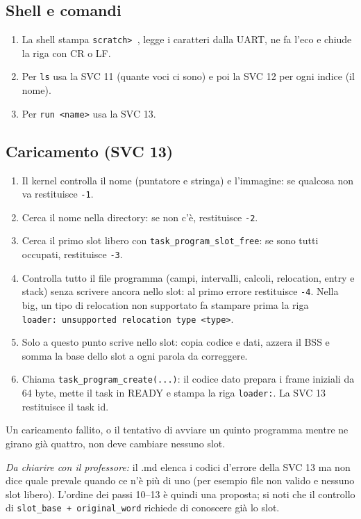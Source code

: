\subsection{Shell e comandi}
\begin{enumerate}\sloppy\setcounter{enumi}{6}
\item La shell stampa \texttt{scratch> }, legge i caratteri dalla UART, ne fa l'eco e chiude la riga con CR o LF.
\item Per \texttt{ls} usa la SVC 11 (quante voci ci sono) e poi la SVC 12 per ogni indice (il nome).
\item Per \texttt{run <name>} usa la SVC 13.
\end{enumerate}

\subsection{Caricamento (SVC 13)}
\begin{enumerate}\sloppy\setcounter{enumi}{9}
\item Il kernel controlla il nome (puntatore e stringa) e l'immagine: se qualcosa non va restituisce \texttt{-1}.
\item Cerca il nome nella directory: se non c'è, restituisce \texttt{-2}.
\item Cerca il primo slot libero con \texttt{task\_program\_slot\_free}: se sono tutti occupati, restituisce \texttt{-3}.
\item Controlla tutto il file programma (campi, intervalli, calcoli, relocation, entry e stack) senza scrivere ancora nello slot: al primo errore restituisce \texttt{-4}. Nella big, un tipo di relocation non supportato fa stampare prima la riga \texttt{loader:\ unsupported relocation type <type>}.
\item Solo a questo punto scrive nello slot: copia codice e dati, azzera il BSS e somma la base dello slot a ogni parola da correggere.
\item Chiama \texttt{task\_program\_create(...)}: il codice dato prepara i frame iniziali da 64 byte, mette il task in READY e stampa la riga \texttt{loader:}. La SVC 13 restituisce il task id.
\end{enumerate}

Un caricamento fallito, o il tentativo di avviare un quinto programma mentre ne girano già quattro, non deve cambiare nessuno slot.

\emph{Da chiarire con il professore:} il .md elenca i codici d'errore della SVC 13 ma non dice quale prevale quando ce n'è più di uno (per esempio file non valido e nessuno slot libero). L'ordine dei passi 10--13 è quindi una proposta; si noti che il controllo di \texttt{slot\_base + original\_word} richiede di conoscere già lo slot.

